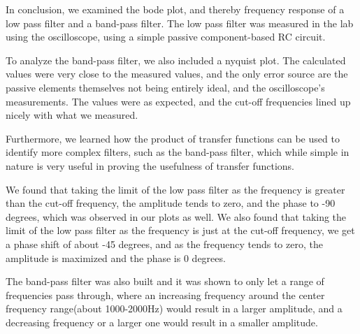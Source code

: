 In conclusion, we examined the bode plot, and thereby frequency response of a low pass filter and a band-pass filter.
The low pass filter was measured in the lab using the oscilloscope, using a simple passive component-based RC circuit.


To analyze the band-pass filter, we also included a nyquist plot. The calculated values were very close to the measured values, and the only error source are the passive elements themselves not being entirely ideal,
and the oscilloscope's measurements. The values were as expected, and the cut-off frequencies lined up nicely with what we measured.

Furthermore, we learned how the product of transfer functions can be used to identify more complex filters, such as the band-pass filter, which while
simple in nature is very useful in proving the usefulness of transfer functions.

We found that taking the limit of the low pass filter as the frequency is greater than the cut-off frequency, the amplitude tends to zero, and the phase to -90 degrees, which was observed in our plots as well.
We also found that taking the limit of the low pass filter as the frequency is just at the cut-off frequency, we get a phase shift of about -45 degrees, and as the frequency tends to zero, the amplitude is maximized and the phase is 0 degrees.

The band-pass filter was also built and it was shown to only let a range of frequencies pass through, where an increasing frequency around the center frequency range(about 1000-2000Hz) would result in a larger amplitude, and a decreasing frequency or a larger one would result in a smaller amplitude.